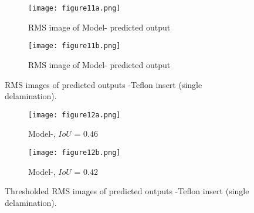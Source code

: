 \begin{figure} [!h]
	\begin{subfigure}[b]{.48\textwidth}
		\centering
		\texttt{[image: figure11a.png]}
		\caption{RMS image of Model- predicted output}
		\label{fig:RMS_CFRP_Teflon_3o_saeed}
	\end{subfigure}
	\hfill
	\begin{subfigure}[b]{.48\textwidth}
		\centering
		\texttt{[image: figure11b.png]}
		\caption{RMS image of Model- predicted output} 
		\label{fig:RMS_CFRP_Teflon_3o_ijjeh}
	\end{subfigure}
	\caption{RMS images of predicted outputs -Teflon insert (single delamination).}
	\label{fig:RMS_CFRP_Teflon_3o_images}
\end{figure} 
\begin{figure} [!h]
	\begin{subfigure}[b]{.48\textwidth}
		\centering
		\texttt{[image: figure12a.png]}
		\caption{Model-, \(IoU\) = \(0.46\)}
		\label{fig:RMS_threshold_CFRP_Teflon_3o_saeed}
	\end{subfigure}
	\hfill
	\begin{subfigure}[b]{.48\textwidth}
		\centering
		\texttt{[image: figure12b.png]}
		\caption{Model-, \(IoU\) = \(0.42\)} 
		\label{fig:RMS_threshold_CFRP_Teflon_3o_ijjeh}
	\end{subfigure}
	\caption{Thresholded RMS images of predicted outputs -Teflon insert (single delamination).}
	\label{fig:RMS_threshold_CFRP_Teflon_3o_images}
\end{figure} 
\clearpage
